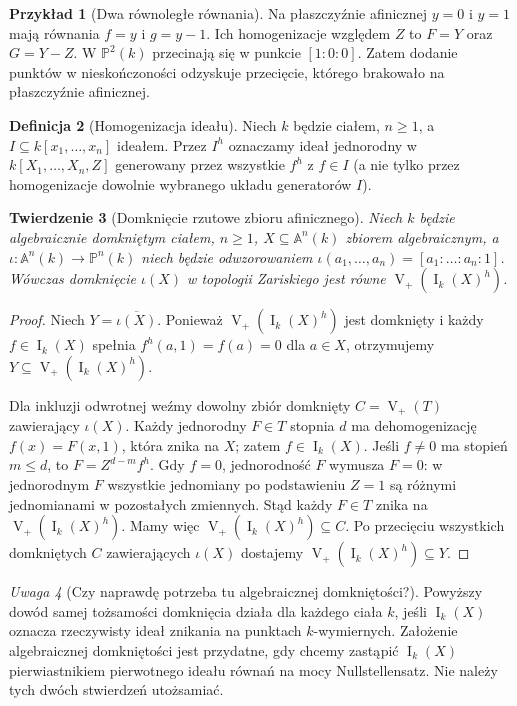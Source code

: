 \documentclass[11pt,a4paper,openany]{report}
\numberwithin{equation}{section}
\theoremstyle{plain}
\newtheorem{twierdzenie}{Twierdzenie}[section]
\theoremstyle{definition}
\newtheorem{definicja}[twierdzenie]{Definicja}
\newtheorem{przyklad}[twierdzenie]{Przykład}
\theoremstyle{remark}
\newtheorem{uwaga}[twierdzenie]{Uwaga}
\newcommand{\A}{\mathbb A}
\newcommand{\PP}{\mathbb P}
\newcommand{\V}{\operatorname V}
\newcommand{\I}{\operatorname I}
\begin{document}
\begin{przyklad}[Dwa równoległe równania]
Na płaszczyźnie afinicznej $y=0$ i $y=1$ mają równania
$f=y$ i $g=y-1$. Ich homogenizacje względem $Z$ to
$F=Y$ oraz $G=Y-Z$.
W $\PP^2(k)$ przecinają się w punkcie $[1:0:0]$.
Zatem dodanie punktów w nieskończoności odzyskuje
przecięcie, którego brakowało na płaszczyźnie afinicznej.
\end{przyklad}

\begin{definicja}[Homogenizacja ideału]
Niech $k$ będzie ciałem, $n\ge1$, a
$I\subseteq k[x_1,\ldots,x_n]$ ideałem.
Przez $I^h$ oznaczamy ideał jednorodny w
$k[X_1,\ldots,X_n,Z]$ generowany przez wszystkie $f^h$
z $f\in I$ (a nie tylko przez homogenizacje dowolnie
wybranego układu generatorów $I$).
\end{definicja}

\begin{twierdzenie}[Domknięcie rzutowe zbioru afinicznego]
\label{tw:projective-closure}
Niech $k$ będzie algebraicznie domkniętym ciałem,
$n\ge1$, $X\subseteq\A^n(k)$ zbiorem algebraicznym,
a $\iota:\A^n(k)\to\PP^n(k)$ niech będzie odwzorowaniem
$\iota(a_1,\dots,a_n)=[a_1:\dots:a_n:1]$.
Wówczas domknięcie $\iota(X)$ w topologii Zariskiego jest równe
$\V_+(\I_k(X)^h)$.
\end{twierdzenie}
\begin{proof}
Niech $Y=\overline{\iota(X)}$.
Ponieważ $\V_+(\I_k(X)^h)$ jest domknięty i każdy
$f\in\I_k(X)$ spełnia $f^h(a,1)=f(a)=0$ dla $a\in X$,
otrzymujemy $Y\subseteq\V_+(\I_k(X)^h)$.

Dla inkluzji odwrotnej weźmy dowolny zbiór domknięty
$C=\V_+(T)$ zawierający $\iota(X)$.
Każdy jednorodny $F\in T$ stopnia $d$ ma dehomogenizację
$f(x)=F(x,1)$, która znika na $X$; zatem $f\in\I_k(X)$.
Jeśli $f\ne0$ ma stopień $m\le d$, to
$F=Z^{d-m}f^h$. Gdy $f=0$, jednorodność $F$ wymusza
$F=0$: w jednorodnym $F$ wszystkie jednomiany po podstawieniu
$Z=1$ są różnymi jednomianami w pozostałych zmiennych.
Stąd każdy $F\in T$ znika na $\V_+(\I_k(X)^h)$.
Mamy więc $\V_+(\I_k(X)^h)\subseteq C$.
Po przecięciu wszystkich domkniętych $C$ zawierających
$\iota(X)$ dostajemy $\V_+(\I_k(X)^h)\subseteq Y$.
\end{proof}

\begin{uwaga}[Czy naprawdę potrzeba tu algebraicznej domkniętości?]
Powyższy dowód samej tożsamości domknięcia działa dla
każdego ciała $k$, jeśli $\I_k(X)$ oznacza rzeczywisty
ideał znikania na punktach $k$-wymiernych. Założenie
algebraicznej domkniętości jest przydatne, gdy chcemy
zastąpić $\I_k(X)$ pierwiastnikiem pierwotnego ideału równań
na mocy Nullstellensatz. Nie należy tych dwóch stwierdzeń
utożsamiać.
\end{uwaga}
\end{document}
